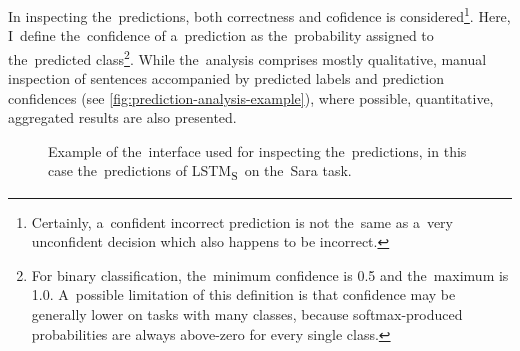 \documentclass[bsc,frontabs,singlespacing,parskip,deptreport]{infthesis}
\def\LSTMS{LSTM\textsubscript{S}}
\begin{document}
{{    In inspecting the~predictions, both correctness and cofidence is considered\footnote{Certainly, a~confident incorrect prediction is not the~same as a~very unconfident decision which also happens to be incorrect.}.
    Here, I~define the~confidence of a~prediction as the~probability assigned to the~predicted class\footnote{For binary classification, the~minimum confidence is 0.5 and the~maximum is 1.0. A~possible limitation of this definition is that confidence may be generally lower on tasks with many classes, because softmax-produced probabilities are always above-zero for every single class.}.
    While the~analysis comprises mostly qualitative, manual inspection of sentences accompanied by predicted labels and prediction confidences (see \autoref{fig:prediction-analysis-example}), where possible, quantitative, aggregated results are also presented.
   
    \begin{figure}[h!b]
      \centering
      \caption{Example of the~interface used for inspecting the~predictions, in this case the~predictions of \LSTMS~on the~Sara task.}
      \label{fig:prediction-analysis-example}
    \end{figure}

}}
\end{document}
